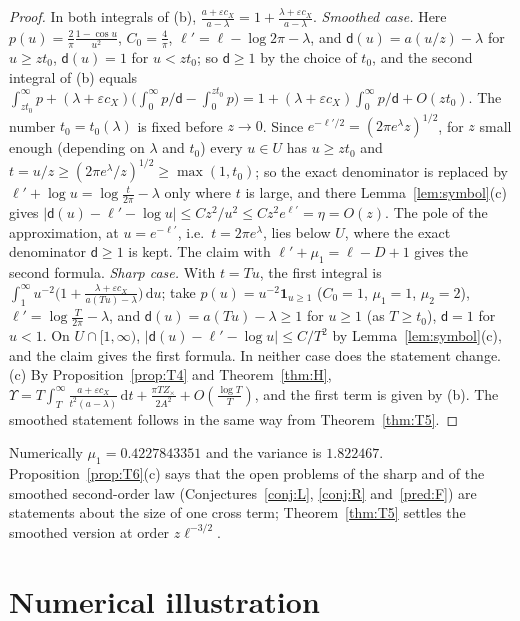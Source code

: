 \documentclass[11pt]{amsart}
\newcommand{\one}{\mathbf{1}}
\newcommand{\dd}{\,\mathrm{d}}
\newcommand{\eps}{\varepsilon}
\theoremstyle{definition}
\theoremstyle{remark}
\numberwithin{equation}{section}
\begin{document}
\begin{proof}
In both integrals of (b), $\frac{a+\eps c_X}{a-\lambda}=1+\frac{\lambda+\eps c_X}{a-\lambda}$. \emph{Smoothed case.} Here $p(u)=\frac2\pi\frac{1-\cos u}{u^2}$, $C_0=\frac4\pi$, $\ell'=\ell-\log2\pi-\lambda$, and $\mathsf d(u)=a(u/z)-\lambda$ for $u\ge zt_0$, $\mathsf d(u)=1$ for $u<zt_0$; so $\mathsf d\ge1$ by the choice of $t_0$, and the second integral of (b) equals $\int_{zt_0}^\infty p+(\lambda+\eps c_X)\bigl(\int_0^\infty p/\mathsf d-\int_0^{zt_0}p\bigr)=1+(\lambda+\eps c_X)\int_0^\infty p/\mathsf d+O(zt_0)$. The number $t_0=t_0(\lambda)$ is fixed before $z\to0$. Since $e^{-\ell'/2}=(2\pi e^\lambda z)^{1/2}$, for $z$ small enough (depending on $\lambda$ and $t_0$) every $u\in U$ has $u\ge zt_0$ and $t=u/z\ge(2\pi e^\lambda/z)^{1/2}\ge\max(1,t_0)$; so the exact denominator is replaced by $\ell'+\log u=\log\frac t{2\pi}-\lambda$ only where $t$ is large, and there Lemma~\ref{lem:symbol}(c) gives $|\mathsf d(u)-\ell'-\log u|\le Cz^2/u^2\le Cz^2e^{\ell'}=\eta=O(z)$. The pole of the approximation, at $u=e^{-\ell'}$, i.e.\ $t=2\pi e^\lambda$, lies below $U$, where the exact denominator $\mathsf d\ge1$ is kept. The claim with $\ell'+\mu_1=\ell-D+1$ gives the second formula. \emph{Sharp case.} With $t=Tu$, the first integral is $\int_1^\infty u^{-2}\bigl(1+\frac{\lambda+\eps c_X}{a(Tu)-\lambda}\bigr)\dd u$; take $p(u)=u^{-2}\one_{u\ge1}$ ($C_0=1$, $\mu_1=1$, $\mu_2=2$), $\ell'=\log\frac T{2\pi}-\lambda$, and $\mathsf d(u)=a(Tu)-\lambda\ge1$ for $u\ge1$ (as $T\ge t_0$), $\mathsf d=1$ for $u<1$. On $U\cap[1,\infty)$, $|\mathsf d(u)-\ell'-\log u|\le C/T^2$ by Lemma~\ref{lem:symbol}(c), and the claim gives the first formula. In neither case does the statement change. (c) By Proposition~\ref{prop:T4} and Theorem~\ref{thm:H}, $\Upsilon=T\int_T^\infty\frac{a+\eps c_X}{t^2(a-\lambda)}\dd t+\frac{\pi TZ_\times}{2A^2}+O(\frac{\log T}T)$, and the first term is given by (b). The smoothed statement follows in the same way from Theorem~\ref{thm:T5}.
\end{proof}

Numerically $\mu_1=0.4227843351$ and the variance is $1.822467$. Proposition~\ref{prop:T6}(c) says that the open problems of the sharp and of the smoothed second-order law (Conjectures~\ref{conj:L}, \ref{conj:R} and~\ref{pred:F}) are statements about the size of one cross term; Theorem~\ref{thm:T5} settles the smoothed version at order $z\ell^{-3/2}$.

\section{Numerical illustration}\label{sec:numerics}
\end{document}
